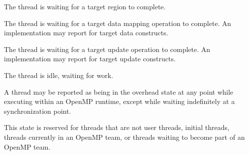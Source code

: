 
\begin{description}

\item {}

  The thread is waiting for a target region to complete.

\item {}

  The thread is waiting for a target data mapping operation to complete.
  An implementation may report 
  for target data constructs.

\item {}

  The thread is waiting for a target  update operation to complete.
  An implementation may report 
  for target update constructs.

\end{description}



\begin{description}
\item {}

  The thread is idle, waiting for work.

\item {}

  A thread may be reported as being in the overhead state at any point while
  executing within an OpenMP runtime, except while waiting indefinitely
  at a synchronization point.


\item {}

  This state is reserved for threads that are not user threads,
  initial threads, threads currently in an OpenMP team, or threads
  waiting to become part of an OpenMP team.

\end{description}
